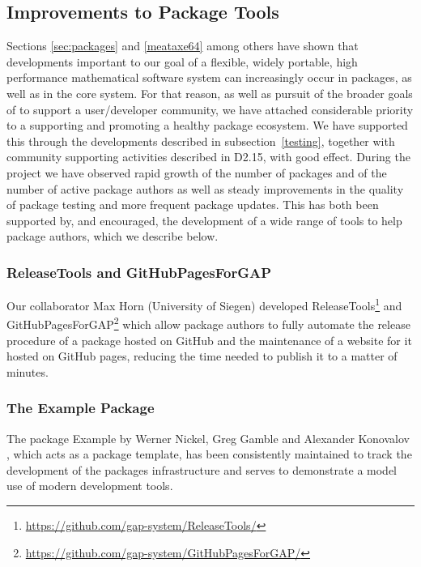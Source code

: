 \subsection{Improvements to \GAP Package Tools}\label{sec:package-tools}

Sections \ref{sec:packages} and \ref{meataxe64} among others have shown
that developments important to our goal of a flexible, widely portable, high performance
mathematical software system can increasingly occur in packages, as
well as in the core \GAP system. For that reason, as well as pursuit
of the broader goals of \ODK to support a user/developer community, we have attached
considerable priority to a supporting and promoting a healthy \GAP
package ecosystem. We have supported this through the developments
described in subsection~\ref{testing}, together with community
supporting activities described in D2.15, with
good effect. During the \ODK
project we have observed rapid growth of the number of \GAP packages
and of the number of active package
authors as well as steady improvements in the quality of package testing and more frequent
package updates. This has both been supported by, and encouraged, the
development of a wide range of tools to help package authors, which we
describe below.

\subsubsection{ReleaseTools and GitHubPagesForGAP}
Our collaborator Max Horn (University of Siegen) developed
{\sf ReleaseTools}\footnote{\url{https://github.com/gap-system/ReleaseTools/}}
and {\sf GitHubPagesForGAP}\footnote{\url{https://github.com/gap-system/GitHubPagesForGAP/}}
which allow package
authors to fully automate the release procedure of a \GAP package hosted on GitHub
and the maintenance of a website for it hosted on GitHub pages,
reducing the time needed to publish it to a matter of minutes.

\subsubsection{The Example Package}
The \GAP package {\sf Example} by Werner Nickel, Greg Gamble and
Alexander Konovalov \cite{example}, which acts as a package template,
has been consistently maintained to track the development of
the packages infrastructure and serves to demonstrate a model use of modern
development tools.

